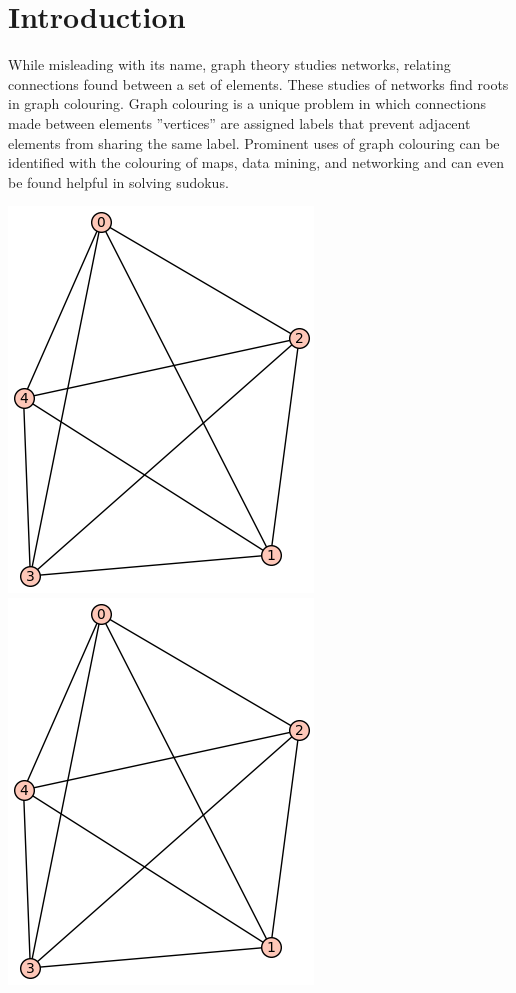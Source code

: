 \documentclass[12pt, letterpaper, twoside]{article}
\begin{document}
\clearpage

\section{Introduction}
While misleading with its name, graph theory studies networks, relating connections found between a set of elements. These studies of networks find roots in graph colouring. 
Graph colouring is a unique problem in which connections made between elements ''vertices'' are assigned labels that prevent adjacent elements from sharing the same label.
Prominent uses of graph colouring can be identified with the colouring of maps, data mining, and networking and can even be found helpful in solving sudokus.

\includegraphics[scale=.35]{test}
\includegraphics[scale=.35]{test}
\end{document}
